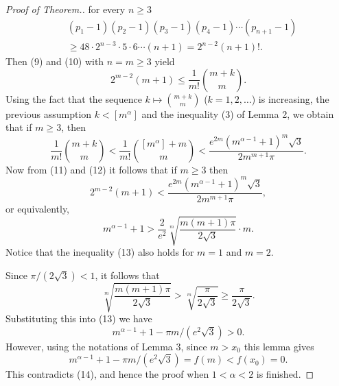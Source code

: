 \documentclass[12pt]{amsart}
\begin{document}
{\begin{proof}[Proof of Theorem.]
for every $n\ge 3$
    \begin{equation}\begin{split}
&(p_1-1)(p_2-1)(p_3-1)(p_4-1)\cdots (p_{n+1}-1)\\
&\ge 48\cdot  2^{n-3}\cdot 5\cdot 6\cdots (n+1)=2^{n-2}(n+1)!.
\end{split}\end{equation}
Then (9) and (10) with $n=m\ge 3$ yield 
 \begin{equation}
 2^{m-2}(m+1)\le \frac{1}{m!}{m+k\choose m}.
  \end{equation}
Using the fact that the sequence $k\mapsto {m+k\choose m}$ 
($k=1,2,\ldots$) is increasing, the previous assumption 
$k<\left[m^\alpha\right]$ and the inequality (3) of Lemma 2, 
we obtain that if  $m\ge 3$, then 
  \begin{equation}
\frac{1}{m!}{m+k\choose m}<\frac{1}{m!}{[m^\alpha]+m\choose m}<
\frac{e^{2m}(m^{\alpha-1} +1)^m\sqrt{3}}{2 m^{m+1}\pi}.
  \end{equation}
Now from (11) and (12) it follows that if $m\ge 3$ then
  \begin{equation*}
2^{m-2}(m+1)<\frac{e^{2m}(m^{\alpha-1} +1)^m\sqrt{3}}{2 m^{m+1}\pi},
  \end{equation*}
or equivalently,
 \begin{equation}
m^{\alpha-1} +1>\frac{2}{e^2}\sqrt[m]{\frac{m(m+1)\pi}{2\sqrt{3}}}\cdot m.
  \end{equation}
Notice that the inequality (13) also holds for $m=1$ and $m=2$.

Since $\pi/(2\sqrt{3})<1$, it follows that  
    \begin{equation*}
\sqrt[m]{\frac{m(m+1)\pi}{2\sqrt{3}}}>
\sqrt[m]{\frac{\pi}{2\sqrt{3}}} 
\ge \frac{\pi}{2\sqrt{3}}.
  \end{equation*}
Substituting this into (13) we have 
 \begin{equation}
m^{\alpha-1} +1-\pi m/(e^2\sqrt{3}) >0.
 \end{equation}
However, using the notations of  Lemma 3, since $m>x_0$ 
this lemma gives
 \begin{equation*}
m^{\alpha-1} +1-\pi m/(e^2\sqrt{3})=f(m)<f(x_0)=0.
 \end{equation*} 
This contradicts (14), and hence the proof when $1<\alpha <2$ 
is finished.


\end{proof}}
\end{document}

